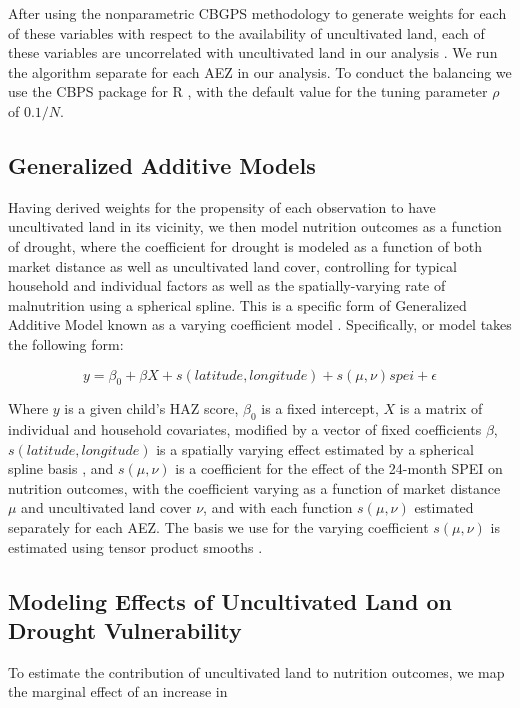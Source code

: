\documentclass{article}
\begin{document}
After using the nonparametric CBGPS methodology to generate weights for each of these variables with respect to the availability of uncultivated land, each of these variables are uncorrelated with uncultivated land in our analysis \cite{Fong2018}.  We run the algorithm separate for each AEZ in our analysis.  To conduct the balancing we use the CBPS package for R \cite{Fong2018a}, with the default value for the tuning parameter $\rho$ of $0.1/N$.

\subsection{Generalized Additive Models}
Having derived weights for the propensity of each observation to have uncultivated land in its vicinity, we then model nutrition outcomes as a function of drought, where the coefficient for drought is modeled as a function of both market distance \cite{Weiss2018} as well as uncultivated land cover, controlling for typical household and individual factors as well as the spatially-varying rate of malnutrition using a spherical spline.  This is a specific form of Generalized Additive Model \cite{Hastie1986} known as a varying coefficient model \cite{Wood2017}.  Specifically, or model takes the following form:

\begin{equation}
 y = \beta_0 + \beta X + s(latitude, longitude) + s(\mu, \nu) spei + \epsilon \label{eqn:GAM}
\end{equation}

Where $y$ is a given child's HAZ score, $\beta_0$ is a fixed intercept, $X$ is a matrix of individual and household covariates, modified by a vector of fixed coefficients $\beta$, $s(latitude, longitude)$ is a spatially varying effect estimated by a spherical spline basis \cite{Wahba1982}, and $s(\mu, \nu)$ is a coefficient for the effect of the 24-month SPEI on nutrition outcomes, with the coefficient varying as a function of market distance $\mu$ and uncultivated land cover $\nu$, and with each function $s(\mu, \nu)$ estimated separately for each AEZ.  The basis we use for the varying coefficient $s(\mu, \nu)$ is estimated using tensor product smooths \cite{Wood2006}.

\subsection{Modeling Effects of Uncultivated Land on Drought Vulnerability}
To estimate the contribution of uncultivated land to nutrition outcomes, we map the marginal effect of an increase in 
\end{document}
